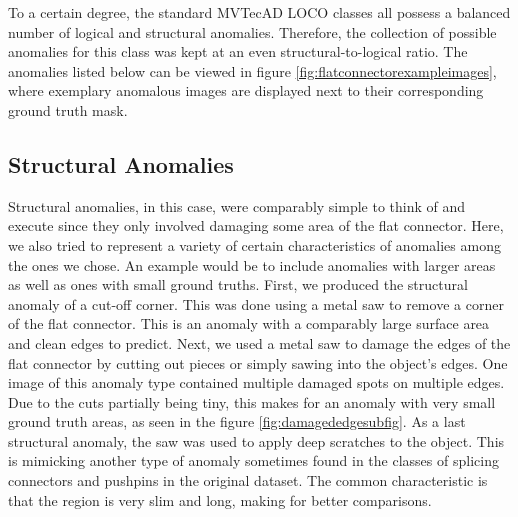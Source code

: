 To a certain degree, the standard MVTecAD LOCO classes all possess a balanced number of logical and structural anomalies. Therefore, the collection of possible anomalies for this class was kept at an even structural-to-logical ratio. The anomalies listed below can be viewed in figure \ref{fig:flatconnectorexampleimages}, where exemplary anomalous images are displayed next to their corresponding ground truth mask.

\subsection{Structural Anomalies}
Structural anomalies, in this case, were comparably simple to think of and execute since they only involved damaging some area of the flat connector. Here, we also tried to represent a variety of 
certain characteristics of anomalies among the ones we chose. An example would be to include anomalies with larger areas as well as ones with small ground truths.\newline
First, we produced the structural anomaly of a cut-off corner. This was done using a metal saw to remove a corner of the flat connector. This is an anomaly with a comparably large 
surface area and clean edges to predict. Next, we used a metal saw to damage the edges of the flat connector by cutting out pieces or simply sawing into the object's edges. One image 
of this anomaly type contained multiple damaged spots on multiple edges. Due to the cuts partially being tiny, this makes for an anomaly with very small ground truth areas, as seen in the figure 
\ref{fig:damagededgesubfig}. As a last structural anomaly, the saw was used to apply deep scratches to the object. This is mimicking another type of anomaly sometimes found in the classes of splicing connectors and pushpins 
in the original dataset. The common characteristic is that the region is very slim and long, making for better comparisons.

